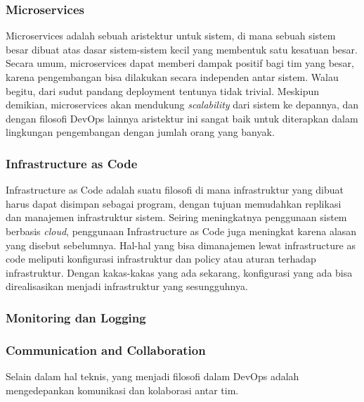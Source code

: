 \subsubsection{Microservices}
Microservices adalah sebuah aristektur untuk sistem, di mana sebuah sistem besar dibuat atas dasar sistem-sistem kecil yang membentuk satu kesatuan besar.
Secara umum, microservices dapat memberi dampak positif bagi tim yang besar, karena pengembangan bisa dilakukan secara independen antar sistem.
Walau begitu, dari sudut pandang deployment tentunya tidak trivial.
Meskipun demikian, microservices akan mendukung \textit{scalability} dari sistem ke depannya, dan dengan filosofi DevOps lainnya aristektur ini sangat baik untuk diterapkan dalam lingkungan pengembangan dengan jumlah orang yang banyak. 

\subsubsection{Infrastructure as Code}
Infrastructure as Code adalah suatu filosofi di mana infrastruktur yang dibuat harus dapat disimpan sebagai program, dengan tujuan memudahkan replikasi dan manajemen infrastruktur sistem.
Seiring meningkatnya penggunaan sistem berbasis \textit{cloud}, penggunaan Infrastructure as Code juga meningkat karena alasan yang disebut sebelumnya.
Hal-hal yang bisa dimanajemen lewat infrastructure as code meliputi konfigurasi infrastruktur dan policy atau aturan terhadap infrastruktur.
Dengan kakas-kakas yang ada sekarang, konfigurasi yang ada bisa direalisasikan menjadi infrastruktur yang sesungguhnya.

\subsubsection{Monitoring dan Logging}


\subsubsection{Communication and Collaboration}
Selain dalam hal teknis, yang menjadi filosofi dalam DevOps adalah mengedepankan komunikasi dan kolaborasi antar tim.

